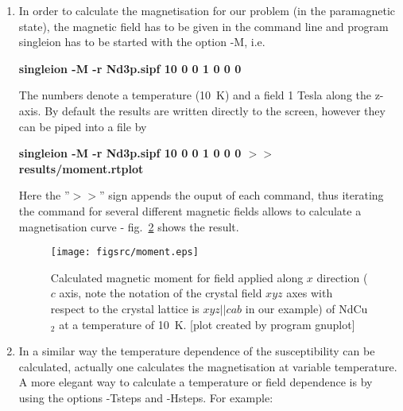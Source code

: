 \begin{enumerate}
{\bf display 1 2 results/Nd3p.sipf.cvt}

In order to create an image file for printing the viewed
spectrum can be saved by either a printscreen or by
using the option {\prg -o file.jpg} of the  {\prg display} program. Such
a jpg image is shown in figure~\ref{spectrum}.
\begin{figure}[ht]
\begin{center}
\texttt{[image: figsrc/10KCEFspectrum.eps]}
\caption{\label{spectrum}
Calculated crystal field neutron spectrum of NdCu$_2$ at a temperature of 10~K.
Horizontal axis is energy transfer in meV and vertical axis is neutron intensity
in barns per meV and Nd atom and sr.
[plot created by program {\prg display}]}
\end{center}
\end{figure}
\item In order to calculate the magnetisation for our problem (in the paramagnetic state), 
 the magnetic field has to be given in the command line and
program {\prg singleion} has to be started with the option {\prg -M}, i.e. 

{\bf singleion -M -r Nd3p.sipf 10 0 0 1 0 0 0}

 The
numbers denote a temperature (10~K) and  a field 1 Tesla along the z-axis.
 By default the results are written directly to the screen, however they can be piped into
a file by 

{\bf singleion -M -r Nd3p.sipf 10 0 0 1 0 0 0 $>>$ results/moment.rtplot}

Here the ''$>>$'' sign appends the ouput of each command, thus iterating the 
command for several different magnetic fields allows to calculate a 
magnetisation curve -  fig.~\ref{moment} shows the result. 

\begin{figure}[ht]
\begin{center}
\texttt{[image: figsrc/moment.eps]}
\caption{\label{moment}
Calculated magnetic moment for field applied along $x$ direction ($c$ axis, note the
notation of the crystal field $xyz$ axes with respect to the crystal lattice is
$xyz||cab$ in our example)
 of NdCu$_2$ at a temperature of 10~K.
[plot created by program {\prg gnuplot}]}
\end{center}
\end{figure}

\item In a similar way the temperature dependence of the susceptibility can be calculated, actually
one calculates the magnetisation at variable temperature. A more elegant way to
calculate a temperature or field dependence is by using the options {\prg -Tsteps}
and {-Hsteps}. For example:


\end{enumerate}
